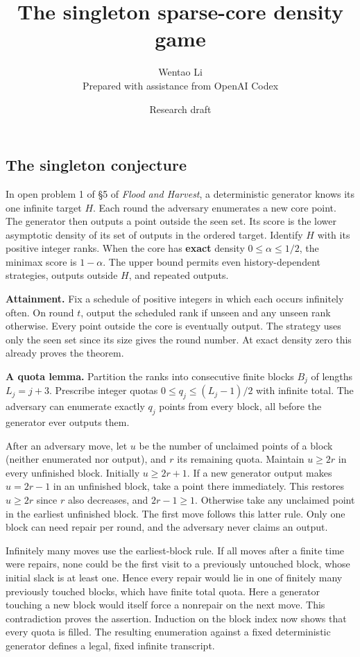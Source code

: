 \documentclass[11pt]{article}
\title{The singleton sparse-core density game}
\author{Wentao Li\\{\small Prepared with assistance from OpenAI Codex}}
\date{Research draft}
\begin{document}
\maketitle
\subsection{The singleton conjecture}\label{the-singleton-conjecture}

In open problem 1 of §5 of \emph{Flood and Harvest}, a deterministic generator knows its one infinite target \(H\). Each round the adversary enumerates a new core point. The generator then outputs a point outside the seen set. Its score is the lower asymptotic density of its set of outputs in the ordered target. Identify \(H\) with its positive integer ranks. When the core has \textbf{exact} density \(0\leq\alpha\leq 1/2\), the minimax score is \(1-\alpha\). The upper bound permits even history-dependent strategies, outputs outside \(H\), and repeated outputs.

\textbf{Attainment.} Fix a schedule of positive integers in which each occurs infinitely often. On round \(t\), output the scheduled rank if unseen and any unseen rank otherwise. Every point outside the core is eventually output. The strategy uses only the seen set since its size gives the round number. At exact density zero this already proves the theorem.

\textbf{A quota lemma.} Partition the ranks into consecutive finite blocks \(B_j\) of lengths \(L_j=j+3\). Prescribe integer quotas \(0\leq q_j\leq (L_j-1)/2\) with infinite total. The adversary can enumerate exactly \(q_j\) points from every block, all before the generator ever outputs them.

After an adversary move, let \(u\) be the number of unclaimed points of a block (neither enumerated nor output), and \(r\) its remaining quota. Maintain \(u\geq 2r\) in every unfinished block. Initially \(u\geq 2r+1\). If a new generator output makes \(u=2r-1\) in an unfinished block, take a point there immediately. This restores \(u\geq 2r\) since \(r\) also decreases, and \(2r-1\geq1\). Otherwise take any unclaimed point in the earliest unfinished block. The first move follows this latter rule. Only one block can need repair per round, and the adversary never claims an output.

Infinitely many moves use the earliest-block rule. If all moves after a finite time were repairs, none could be the first visit to a previously untouched block, whose initial slack is at least one. Hence every repair would lie in one of finitely many previously touched blocks, which have finite total quota. Here a generator touching a new block would itself force a nonrepair on the next move. This contradiction proves the assertion. Induction on the block index now shows that every quota is filled. The resulting enumeration against a fixed deterministic generator defines a legal, fixed infinite transcript.
\end{document}
